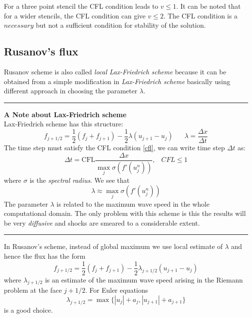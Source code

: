 For a three point stencil the CFL condition leads to $v \leq 1$. It can be noted that for a wider stencils, the CFL condition can give $v \leq 2$. The CFL condition is a $necessary$ but not a sufficient condition for stability of the solution.
\subsection{Rusanov's flux}
Rusanov scheme \cite{rusanov} is also called {\em local Lax-Friedrich scheme} \cite{notes_ncm} because it can be obtained from a simple modification in {\em Lax-Friedrich scheme} basically using different approach in choosing the parameter $\lambda$. \vspace{8pt}
\hrule \vspace{8pt}
\hspace{-17pt}\textbf{A Note about Lax-Friedrich scheme}\\
Lax-Friedrich scheme has this structure:
\begin{equation}
    f_{j+1/2} = \frac{1}{2}\left(f_j + f_{j+1} \right) - \frac{1}{2}\lambda \left(u_{j+1} - u_j \right) \hspace{20pt} \lambda = \frac{\Delta x}{\Delta t}
\end{equation} 
The time step must satisfy the CFL condition \ref{cfl}, we can write time step $\Delta t$ as:
\begin{equation*}
    \Delta t = \text{CFL}\frac{\Delta x}{\max\limits_{j} \sigma(f'(u_j^n))}, \hspace{10pt} CFL \leq 1
\end{equation*}
where $\sigma$ is the {\em spectral radius}. We see that
\begin{equation*}
    \lambda \approx \max\limits_j \sigma(f'(u_j^n))
\end{equation*}
The parameter $\lambda$ is related to the maximum wave speed in the whole computational domain. The only problem with this scheme is this the results will be very {\em diffusive} and shocks are smeared to a considerable extent.
\vspace{5pt} \hrule \vspace{5pt}
In Rusanov's scheme, instead of global maximum we use local estimate of $\lambda$ and hence the flux has the form
\begin{equation}
    f_{j+1/2} = \frac{1}{2}(f_j + f_{j+1}) - \frac{1}{2} \lambda_{j+1/2}(u_{j+1} - u_j)
\end{equation}
where $\lambda_{j+1/2}$ is an estimate of the maximum wave speed arising in the Riemann problem at the face $j+1/2$. For Euler equations
\begin{equation*}
    \lambda_{j+1/2} = \max\{|u_j| + a_j, |u_{j+1}| + a_{j+1}\}
\end{equation*} is a good choice.

